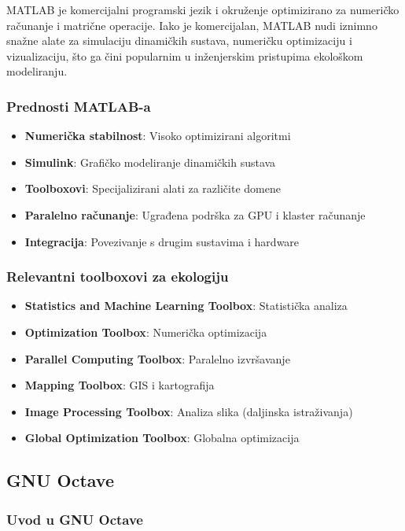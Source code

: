 \documentclass[11pt,oneside]{book}
\begin{document}
MATLAB je komercijalni programski jezik i okruženje optimizirano za numeričko računanje i matrične operacije. Iako je komercijalan, MATLAB nudi iznimno snažne alate za simulaciju dinamičkih sustava, numeričku optimizaciju i vizualizaciju, što ga čini popularnim u inženjerskim pristupima ekološkom modeliranju.

\subsubsection{Prednosti MATLAB-a}

\begin{itemize}
	\item \textbf{Numerička stabilnost}: Visoko optimizirani algoritmi
	\item \textbf{Simulink}: Grafičko modeliranje dinamičkih sustava
	\item \textbf{Toolboxovi}: Specijalizirani alati za različite domene
	\item \textbf{Paralelno računanje}: Ugrađena podrška za GPU i klaster računanje
	\item \textbf{Integracija}: Povezivanje s drugim sustavima i hardware
\end{itemize}

\subsubsection{Relevantni toolboxovi za ekologiju}

\begin{itemize}
	\item \textbf{Statistics and Machine Learning Toolbox}: Statistička analiza
	\item \textbf{Optimization Toolbox}: Numerička optimizacija
	\item \textbf{Parallel Computing Toolbox}: Paralelno izvršavanje
	\item \textbf{Mapping Toolbox}: GIS i kartografija
	\item \textbf{Image Processing Toolbox}: Analiza slika (daljinska istraživanja)
	\item \textbf{Global Optimization Toolbox}: Globalna optimizacija
\end{itemize}

\subsection{GNU Octave}

\subsubsection{Uvod u GNU Octave}
\end{document}
